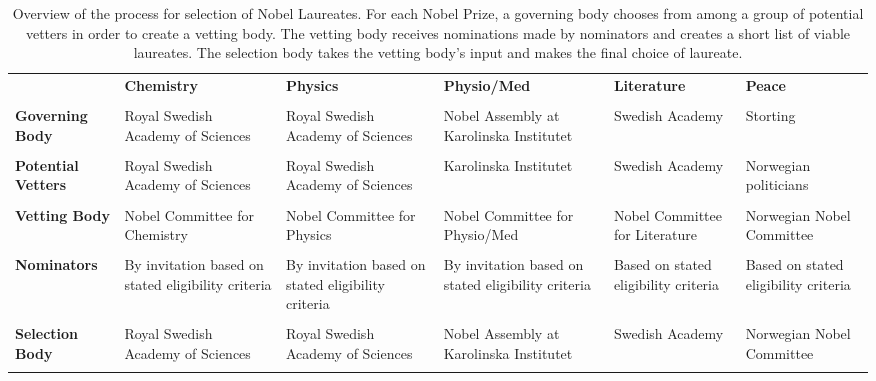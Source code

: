 \documentclass[11pt]{article}
\begin{document}
\begin{table}[t!]
\footnotesize
\begin{threeparttable}
\caption{Overview of the process for selection of Nobel Laureates. For each Nobel Prize, a governing body chooses from among a group of potential vetters in order to create a vetting body. The vetting body receives nominations made by nominators and creates a short list of viable laureates. The selection body takes the vetting body's input and makes the final choice of laureate.\label{Tab1}}
\bigskip
\begin{tabular}{p{}sssss}
               & \bf Chemistry                                          & \bf Physics                                            & \bf Physio/Med                             & \bf Literature                           & \bf Peace                                                      \\ 
               &&&&& \\
\bf Governing Body & Royal Swedish Academy of Sciences                  & Royal Swedish Academy of Sciences                  & Nobel Assembly at Karolinska Institutet               & Swedish Academy                      & Storting                                                   \\
&&&&&\\
\bf Potential Vetters    & Royal Swedish Academy of Sciences                  & Royal Swedish Academy of Sciences                  & Karolinska Institutet                                & Swedish Academy                      & Norwegian politicians \\
&&&&&\\
\bf Vetting Body   & Nobel Committee for Chemistry                      & Nobel Committee for Physics                        & Nobel Committee for Physio/Med                & Nobel Committee for Literature       & Norwegian Nobel Committee                                  \\
&&&&&\\
\bf Nominators     & By invitation based on stated eligibility criteria & By invitation based on stated eligibility criteria & By invitation based on stated eligibility criteria & Based on stated eligibility criteria & Based on stated eligibility criteria                       \\
&&&&&\\
\bf Selection Body & Royal Swedish Academy of Sciences                  & Royal Swedish Academy of Sciences                  & Nobel Assembly at Karolinska Institutet                & Swedish Academy                      & Norwegian Nobel Committee \\ \\ 

\end{tabular}
\end{threeparttable}
\end{table}
\end{document}
